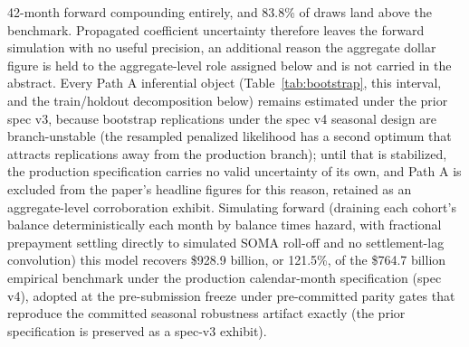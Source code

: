 \documentclass[12pt]{article}
\begin{document}
42-month forward compounding entirely, and 83.8\% of draws land above the benchmark. Propagated coefficient uncertainty therefore leaves the forward simulation with no useful precision, an additional reason the aggregate dollar figure is held to the aggregate-level role assigned below and is not carried in the abstract. Every Path A inferential object (Table~\ref{tab:bootstrap}, this interval, and the train/holdout decomposition below) remains estimated under the prior spec v3, because bootstrap replications under the spec v4 seasonal design are branch-unstable (the resampled penalized likelihood has a second optimum that attracts replications away from the production branch); until that is stabilized, the production specification carries no valid uncertainty of its own, and Path A is excluded from the paper's headline figures for this reason, retained as an aggregate-level corroboration exhibit. Simulating forward (draining each cohort's balance deterministically each month by balance times hazard, with fractional prepayment settling directly to simulated SOMA roll-off and no settlement-lag convolution) this model recovers \$928.9 billion, or 121.5\%, of the \$764.7 billion empirical benchmark under the production calendar-month specification (spec v4), adopted at the pre-submission freeze under pre-committed parity gates that reproduce the committed seasonal robustness artifact exactly (the prior specification is preserved as a spec-v3 exhibit).
\end{document}
